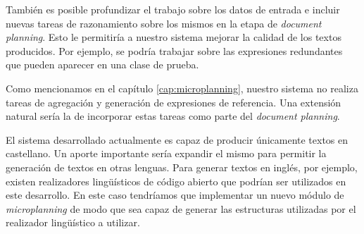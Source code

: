También es posible profundizar el trabajo sobre los datos de entrada e incluir nuevas tareas de razonamiento sobre los mismos en la etapa de \textit{document planning}. Esto le permitiría a nuestro sistema mejorar la calidad de los textos producidos. Por ejemplo, se podría trabajar sobre las expresiones redundantes que pueden aparecer en una clase de prueba.

Como mencionamos en el capítulo \ref{cap:microplanning}, nuestro sistema no realiza tareas de agregación y generación de expresiones de referencia. Una extensión natural sería la de incorporar estas tareas como parte del \textit{document planning}.

El sistema desarrollado actualmente es capaz de producir únicamente textos en castellano. Un aporte importante sería expandir el mismo para permitir la generación de textos en otras lenguas. Para generar textos en inglés, por ejemplo, existen realizadores lingüísticos de código abierto que podrían ser utilizados en este desarrollo. En este caso tendríamos que implementar un nuevo módulo de \textit{microplanning} de modo que sea capaz de generar las estructuras utilizadas por el realizador lingüístico a utilizar.